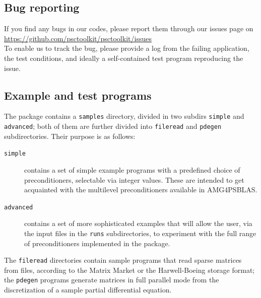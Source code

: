 \subsection{Bug reporting}
If you find any bugs in our codes, please report them through our
issues page on \\[2mm]
\url{https://github.com/psctoolkit/psctoolkit/issues}\\

To enable us to track the bug, please provide a log from the failing
application, the test conditions, and ideally a self-contained test
program reproducing the issue.

\subsection{Example and test programs\label{sec:ex_and_test}}
The package contains a \verb|samples| directory, divided in two
subdirs  \verb|simple| and \verb|advanced|;
both of them are further divided into \verb|fileread| and
\verb|pdegen| subdirectories. Their purpose is as follows:
\begin{description}
\item[\tt simple] contains a set of simple example programs with a
  predefined choice of preconditioners, selectable via integer
  values. These are intended to get  acquainted with the
  multilevel preconditioners available in AMG4PSBLAS.
\item[\tt advanced] contains a set of more sophisticated examples that
  will allow the user, via the input files in the \verb|runs|
  subdirectories, to experiment with the full range of preconditioners
  implemented in the package.
\end{description}
The \verb|fileread| directories contain sample programs that read
sparse matrices from files, according to the Matrix Market or the
Harwell-Boeing storage format; the \verb|pdegen| programs generate
matrices in full parallel mode from the discretization of a sample partial
differential equation.
